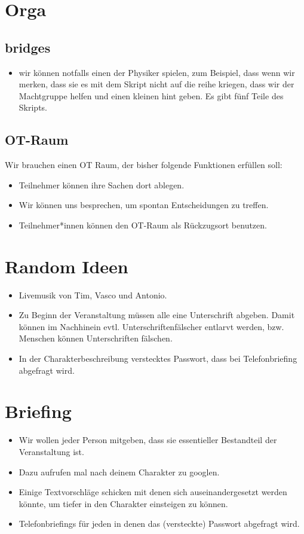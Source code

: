 \documentclass[12pt, a4paper, openany]{report}
\begin{document}
\chapter{Orga}
\section {bridges}
\begin{itemize}
    \item wir können notfalls einen der Physiker spielen, zum Beispiel, dass wenn wir merken, dass sie es mit dem Skript nicht auf die reihe kriegen, dass wir der Machtgruppe helfen und einen kleinen hint geben. Es gibt fünf Teile des Skripts.
\end{itemize}
\section{OT-Raum}
Wir brauchen einen OT Raum, der bisher folgende Funktionen erfüllen soll:
\begin{itemize}
    \item Teilnehmer können ihre Sachen dort ablegen.
    \item Wir können uns besprechen, um spontan Entscheidungen zu treffen.
    \item Teilnehmer*innen können den OT-Raum als Rückzugsort benutzen. 
\end{itemize}

\chapter{Random Ideen}
\begin{itemize}
    \item Livemusik von Tim, Vasco und Antonio.
    \item Zu Beginn der Veranstaltung müssen alle eine Unterschrift abgeben. 
Damit können im Nachhinein evtl. Unterschriftenfälscher entlarvt werden, bzw. Menschen können Unterschriften fälschen.
    \item In der Charakterbeschreibung verstecktes Passwort, dass bei Telefonbriefing abgefragt wird.
\end{itemize}

\chapter{Briefing}
\begin{itemize}
    \item Wir wollen jeder Person mitgeben, dass sie essentieller Bestandteil der Veranstaltung ist.
    \item Dazu aufrufen mal nach deinem Charakter zu googlen.
    \item Einige Textvorschläge schicken mit denen sich auseinandergesetzt werden könnte, um tiefer in den Charakter einsteigen zu können.
    \item Telefonbriefings für jeden in denen das (versteckte) Passwort abgefragt wird.
\end{itemize}
\end{document}
